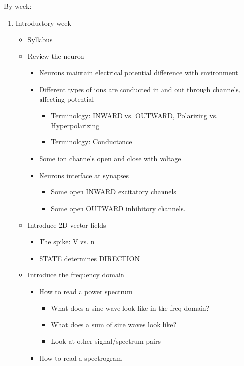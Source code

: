 \documentclass[11pt, reqno]{amsart}
\numberwithin{figure}{section}
\numberwithin{equation}{section}
\begin{document}
By week:
\begin{enumerate}

\item Introductory week
	\begin{itemize}
	\item Syllabus
	\item Review the neuron
		\begin{itemize}
		\item Neurons maintain electrical potential difference with environment
		\item Different types of ions are conducted in and out through channels, affecting potential
			\begin{itemize}
			\item Terminology: INWARD vs. OUTWARD, Polarizing vs. Hyperpolarizing
			\item Terminology: Conductance
			\end{itemize}
		\item Some ion channels open and close with voltage
		\item Neurons interface at synapses
			\begin{itemize}
			\item Some open INWARD excitatory channels
			\item Some open OUTWARD inhibitory channels.
			\end{itemize}
		\end{itemize}
	\item Introduce 2D vector fields
		\begin{itemize}
		\item The spike: V vs. n
		\item STATE determines DIRECTION
		\end{itemize}
	\item Introduce the frequency domain
		\begin{itemize}
		\item How to read a power spectrum
			\begin{itemize}
			\item What does a sine wave look like in the freq domain?
			\item What does a sum of sine waves look like?
			\item Look at other signal/spectrum pairs
			\end{itemize}
		\item How to read a spectrogram
		\end{itemize}
	\end{itemize}
	

\end{enumerate}
\end{document}
